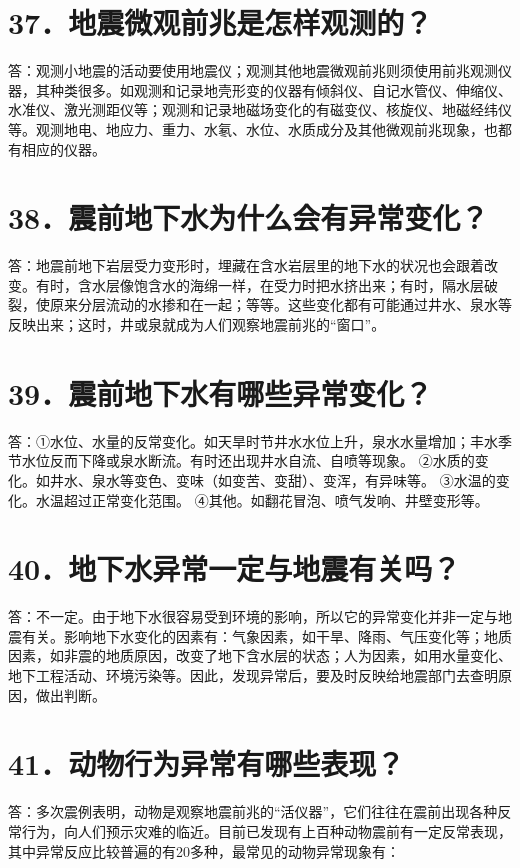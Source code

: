 \documentclass[a4paper,12pt,english]{sphinxmanual}
\begin{document}
\section{37．地震微观前兆是怎样观测的？}
\label{\detokenize{index:id43}}
答：观测小地震的活动要使用地震仪；观测其他地震微观前兆则须使用前兆观测仪器，其种类很多。如观测和记录地壳形变的仪器有倾斜仪、自记水管仪、伸缩仪、水准仪、激光测距仪等；观测和记录地磁场变化的有磁变仪、核旋仪、地磁经纬仪等。观测地电、地应力、重力、水氡、水位、水质成分及其他微观前兆现象，也都有相应的仪器。


\section{38．震前地下水为什么会有异常变化？}
\label{\detokenize{index:id44}}
答：地震前地下岩层受力变形时，埋藏在含水岩层里的地下水的状况也会跟着改变。有时，含水层像饱含水的海绵一样，在受力时把水挤出来；有时，隔水层破裂，使原来分层流动的水掺和在一起；等等。这些变化都有可能通过井水、泉水等反映出来；这时，井或泉就成为人们观察地震前兆的“窗口”。


\section{39．震前地下水有哪些异常变化？}
\label{\detokenize{index:id45}}
答：①水位、水量的反常变化。如天旱时节井水水位上升，泉水水量增加；丰水季节水位反而下降或泉水断流。有时还出现井水自流、自喷等现象。
②水质的变化。如井水、泉水等变色、变味（如变苦、变甜）、变浑，有异味等。
③水温的变化。水温超过正常变化范围。
④其他。如翻花冒泡、喷气发响、井壁变形等。


\section{40．地下水异常一定与地震有关吗？}
\label{\detokenize{index:id46}}
答：不一定。由于地下水很容易受到环境的影响，所以它的异常变化并非一定与地震有关。影响地下水变化的因素有：气象因素，如干旱、降雨、气压变化等；地质因素，如非震的地质原因，改变了地下含水层的状态；人为因素，如用水量变化、地下工程活动、环境污染等。因此，发现异常后，要及时反映给地震部门去查明原因，做出判断。


\section{41．动物行为异常有哪些表现？}
\label{\detokenize{index:id47}}
答：多次震例表明，动物是观察地震前兆的“活仪器”，它们往往在震前出现各种反常行为，向人们预示灾难的临近。目前已发现有上百种动物震前有一定反常表现，其中异常反应比较普遍的有20多种，最常见的动物异常现象有：
\begin{quote}

\end{quote}
\end{document}
